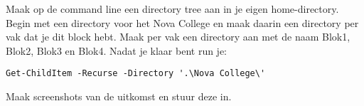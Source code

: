 Maak op de command line een directory tree aan in je eigen home-directory. Begin met een directory voor het Nova College en maak daarin een directory per vak dat je dit block hebt. Maak per vak een directory aan met de naam Blok1, Blok2, Blok3 en Blok4. Nadat je klaar bent run je:
\begin{lstlisting}[style=DOS]
Get-ChildItem -Recurse -Directory '.\Nova College\'
\end{lstlisting}

Maak screenshots van de uitkomst en stuur deze in.

